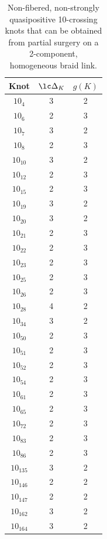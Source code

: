 \documentclass[11pt,e-only]{amsart}
\begin{document}
\newpage
\begin{table}[h!]
    \centering
    \begin{tabular}{|c|c|c|}
        \hline
         Knot & $\lc \Delta_K$ & $g(K)$ \\
         \hline
         $10_4$ & 3 & 2 \\
         $10_6$ & 2 & 3 \\
         $10_7$ & 3 & 2 \\
         $10_8$ & 2 & 3 \\
         $10_{10}$ & 3 & 2 \\
         $10_{12}$ & 2 & 3 \\
         $10_{15}$ & 2 & 3 \\
         $10_{19}$ & 3 & 2 \\
         $10_{20}$ & 3 & 2 \\
         $10_{21}$ & 2 & 3 \\
         $10_{22}$ & 2 & 3 \\
         $10_{23}$ & 2 & 3 \\
         $10_{25}$ & 2 & 3 \\
         $10_{26}$ & 2 & 3 \\
         $10_{28}$ & 4 & 2 \\
         $10_{34}$ & 3 & 2 \\
         $10_{50}$ & 2 & 3 \\
         $10_{51}$ & 2 & 3 \\
         $10_{52}$ & 2 & 3 \\
         $10_{54}$ & 2 & 3 \\
         $10_{61}$ & 2 & 3 \\
         $10_{65}$ & 2 & 3 \\
         $10_{72}$ & 2 & 3 \\
         $10_{83}$ & 2 & 3 \\
         $10_{86}$ & 2 & 3 \\
         $10_{135}$ & 3 & 2 \\
         $10_{146}$ & 2 & 2 \\
         $10_{147}$ & 2 & 2 \\
         $10_{162}$ & 3 & 2 \\
         $10_{164}$ & 3 & 2 \\
         \hline
    \end{tabular}
    \caption{Non-fibered, non-strongly quasipositive 10-crossing knots that can be obtained from partial surgery on a 2-component, homogeneous braid link.}
    \label{tab:placeholder}
\end{table}
\end{document}
